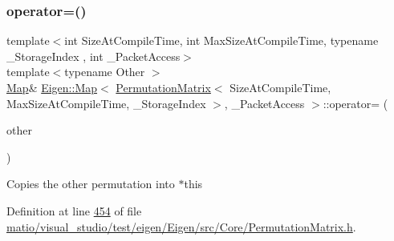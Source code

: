 \mbox{\label{class_eigen_1_1_map_3_01_permutation_matrix_3_01_size_at_compile_time_00_01_max_size_at_compile_2f9d18bf0084dbfb13fbbfe14adaf22d_a15e39faf193bf3d15f75c81096a95e72}} 
\subsubsection{\texorpdfstring{operator=()}{operator=()}\hspace{0.1cm}{\footnotesize\ttfamily [2/6]}}
{\footnotesize\ttfamily template$<$int Size\+At\+Compile\+Time, int Max\+Size\+At\+Compile\+Time, typename \+\_\+\+Storage\+Index , int \+\_\+\+Packet\+Access$>$ \\
template$<$typename Other $>$ \\
\hyperlink{group___core___module_class_eigen_1_1_map}{Map}\& \hyperlink{group___core___module_class_eigen_1_1_map}{Eigen\+::\+Map}$<$ \hyperlink{group___core___module_class_eigen_1_1_permutation_matrix}{Permutation\+Matrix}$<$ Size\+At\+Compile\+Time, Max\+Size\+At\+Compile\+Time, \+\_\+\+Storage\+Index $>$, \+\_\+\+Packet\+Access $>$\+::operator= (\begin{DoxyParamCaption}\item[{const \hyperlink{group___core___module_class_eigen_1_1_permutation_base}{Permutation\+Base}$<$ Other $>$ \&}]{other }\end{DoxyParamCaption})\hspace{0.3cm}{\ttfamily [inline]}}

Copies the other permutation into $\ast$this 

Definition at line \hyperlink{matio_2visual__studio_2test_2eigen_2_eigen_2src_2_core_2_permutation_matrix_8h_source_l00454}{454} of file \hyperlink{matio_2visual__studio_2test_2eigen_2_eigen_2src_2_core_2_permutation_matrix_8h_source}{matio/visual\+\_\+studio/test/eigen/\+Eigen/src/\+Core/\+Permutation\+Matrix.\+h}.

